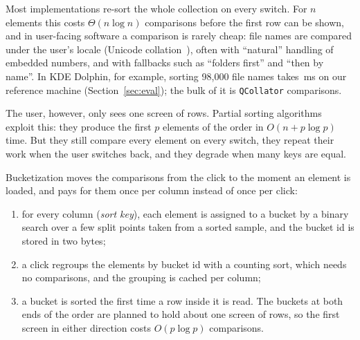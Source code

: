 \documentclass[11pt]{article}
\theoremstyle{definition}
\begin{document}
Most implementations re-sort the whole collection on every switch. For $n$
elements this costs $\Theta(n\log n)$ comparisons before the first row can be
shown, and in user-facing software a comparison is rarely cheap: file names
are compared under the user's locale (Unicode collation~\cite{uts10}), often
with ``natural'' handling of embedded numbers, and with fallbacks such as
``folders first'' and ``then by name''. In KDE Dolphin, for example, sorting
98{,}000 file names takes \,ms on our
reference machine (Section~\ref{sec:eval}); the bulk of it is
\texttt{QCollator} comparisons.

The user, however, only sees one screen of rows. Partial sorting
algorithms~\cite{martinez2004partial,paredes2006incremental} exploit this: they
produce the first $p$ elements of the order in $O(n + p\log p)$ time. But they
still compare every element on every switch, they repeat their work when the
user switches back, and they degrade when many keys are equal.

Bucketization moves the comparisons from the click to the moment an element is
loaded, and pays for them once per column instead of once per click:
\begin{enumerate}
\item for every column (\emph{sort key}), each element is assigned to a bucket
  by a binary search over a few split points taken from a sorted sample, and
  the bucket id is stored in two bytes;
\item a click regroups the elements by bucket id with a counting sort, which
  needs no comparisons, and the grouping is cached per column;
\item a bucket is sorted the first time a row inside it is read. The buckets at
  both ends of the order are planned to hold about one screen of rows, so the
  first screen in either direction costs $O(p\log p)$ comparisons.
\end{enumerate}
\end{document}
